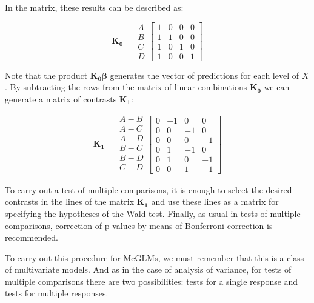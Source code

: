 \documentclass[article]{jss}\usepackage[]{graphicx}\usepackage[]{xcolor}
\begin{document}
In the matrix, these results can be described as:

$$
    \boldsymbol{K_0} = 
      \begin{matrix}
        A\\ 
        B\\ 
        C\\ 
        D 
      \end{matrix} 
    \begin{bmatrix}
      1 & 0 & 0 & 0\\ 
      1 & 1 & 0 & 0\\ 
      1 & 0 & 1 & 0\\ 
      1 & 0 & 0 & 1 
    \end{bmatrix}
$$

Note that the product $\boldsymbol{K_0} \boldsymbol{\beta}$ generates the vector of predictions for each level of $X$. By subtracting the rows from the matrix of linear combinations $\boldsymbol{K_0}$ we can generate a matrix of contrasts $\boldsymbol{K_1}$:

$$
    \boldsymbol{K_1} = 
      \begin{matrix}
        A-B\\ 
        A-C\\ 
        A-D\\ 
        B-C\\
        B-D\\
        C-D\\ 
      \end{matrix} 
    \begin{bmatrix}
      0 & -1 &  0 &  0\\ 
      0 &  0 & -1 &  0\\ 
      0 &  0 &  0 & -1\\ 
      0 &  1 & -1 &  0\\ 
      0 &  1 &  0 & -1\\ 
      0 &  0 &  1 & -1 
    \end{bmatrix}
$$

To carry out a test of multiple comparisons, it is enough to select the desired contrasts in the lines of the matrix $\boldsymbol{K_1}$ and use these lines as a matrix for specifying the hypotheses of the Wald test. Finally, as usual in tests of multiple comparisons, correction of p-values by means of Bonferroni correction is recommended.

To carry out this procedure for McGLMs, we must remember that this is a class of multivariate models. And as in the case of analysis of variance, for tests of multiple comparisons there are two possibilities: tests for a single response and tests for multiple responses.
\end{document}
